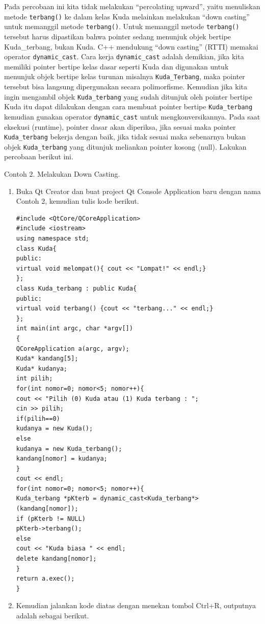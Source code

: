 Pada percobaan ini kita tidak melakukan ``percolating upward'', yaitu
menuliskan metode \texttt{terbang()} ke dalam kelas Kuda melainkan
melakukan ``down casting'' untuk memanggil metode \texttt{terbang()}.
Untuk memanggil metode \texttt{terbang()} tersebut harus dipastikan
bahwa pointer sedang menunjuk objek bertipe Kuda\_terbang, bukan Kuda.
C++ mendukung ``down casting'' (RTTI) memakai operator
\texttt{dynamic\_cast}. Cara kerja \texttt{dynamic\_cast} adalah
demikian, jika kita memiliki pointer bertipe kelas dasar seperti Kuda
dan digunakan untuk menunjuk objek bertipe kelas turunan misalnya
\texttt{Kuda\_Terbang}, maka pointer tersebut bisa langsung dipergunakan
secara polimorfisme. Kemudian jika kita ingin mengambil objek
\texttt{Kuda\_terbang} yang sudah ditunjuk oleh pointer bertipe Kuda itu
dapat dilakukan dengan cara membuat pointer bertipe
\texttt{Kuda\_terbang} kemudian gunakan operator \texttt{dynamic\_cast}
untuk mengkonversikannya. Pada saat eksekusi (runtime), pointer dasar
akan diperiksa, jika sesuai maka pointer \texttt{Kuda\_terbang} bekerja
dengan baik, jika tidak sesuai maka sebenarnya bukan objek
\texttt{Kuda\_terbang} yang ditunjuk meliankan pointer kosong (null).
Lakukan percobaan berikut ini.

Contoh 2. Melakukan Down Casting.

\begin{enumerate}
\def\labelenumi{\arabic{enumi}.}
\item
  Buka Qt Creator dan buat project Qt Console Application baru dengan
  nama Contoh 2, kemudian tulis kode berikut.

\begin{verbatim}
#include <QtCore/QCoreApplication>
#include <iostream>
using namespace std;
class Kuda{
public:
virtual void melompat(){ cout << "Lompat!" << endl;}
};
class Kuda_terbang : public Kuda{
public:
virtual void terbang() {cout << "terbang..." << endl;}
};
int main(int argc, char *argv[])
{
QCoreApplication a(argc, argv);
Kuda* kandang[5];
Kuda* kudanya;
int pilih;
for(int nomor=0; nomor<5; nomor++){
cout << "Pilih (0) Kuda atau (1) Kuda terbang : ";
cin >> pilih;
if(pilih==0)
kudanya = new Kuda();
else
kudanya = new Kuda_terbang();
kandang[nomor] = kudanya;
}
cout << endl;
for(int nomor=0; nomor<5; nomor++){
Kuda_terbang *pKterb = dynamic_cast<Kuda_terbang*> (kandang[nomor]);
if (pKterb != NULL)
pKterb->terbang();
else
cout << "Kuda biasa " << endl;
delete kandang[nomor];
}
return a.exec();
}
\end{verbatim}
\item
  Kemudian jalankan kode diatas dengan menekan tombol Ctrl+R, outputnya
  adalah sebagai berikut.
\end{enumerate}

